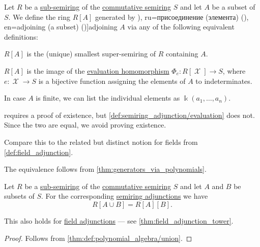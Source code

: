 \begin{definition}\label{def:semiring_adjunction}
  Let \( R \) be a \hyperref[def:ring/subobject]{sub-semiring} of the \hyperref[def:semiring/commutative]{commutative semiring} \( S \) and let \( A \) be a subset of \( S \). We define the ring \( R[A] \) generated by \term[bg=присъединяване/адюнгиране (на елемент) (\cite[425]{Обрешков1962ВисшаАлгебра}), ru=присоединение (элемента) (\cite[288]{Курош1968КурсВысшейАлгебры}), en=adjoining (a subset) (\cite[119]{Jacobson1985BasicAlgebraI})]{adjoining} \( A \) via any of the following equivalent definitions:
  \begin{thmenum}
     \( R[A] \) is the (unique) smallest super-semiring of \( R \) containing \( A \).

     \( R[A] \) is the image of the \hyperref[con:free_construction/evaluation]{evaluation homomorphism} \( \Phi_e: R[\mscrX] \to S \), where \( e: \mscrX \to S \) is a bijective function assigning the elements of \( A \) to indeterminates.
  \end{thmenum}

  In case \( A \) is finite, we can list the individual elements as \( \Bbbk(a_1, \ldots, a_n) \).
\end{definition}
\begin{comments}
  \item {} requires a proof of existence, but \cref{def:semiring_adjunction/evaluation} does not. Since the two are equal, we avoid proving existence.
  \item Compare this to the related but distinct notion for fields from \cref{def:field_adjunction}.
\end{comments}
\begin{defproof}
  The equivalence follows from \cref{thm:generators_via_polynomials}.
\end{defproof}

\begin{proposition}\label{thm:semiring_adjunction_tower}
  Let \( R \) be a \hyperref[def:ring/subobject]{sub-semiring} of the \hyperref[def:semiring/commutative]{commutative semiring} \( S \) and let \( A \) and \( B \) be subsets of \( S \). For the corresponding \hyperref[def:semiring_adjunction]{semiring adjunctions} we have
  \begin{equation*}
    R[A \cup B] = R[A][B].
  \end{equation*}
\end{proposition}
\begin{comments}
  \item This also holds for \hyperref[def:field_adjunction]{field adjunctions} --- see \cref{thm:field_adjunction_tower}.
\end{comments}
\begin{proof}
  Follows from \cref{thm:def:polynomial_algebra/union}.
\end{proof}

